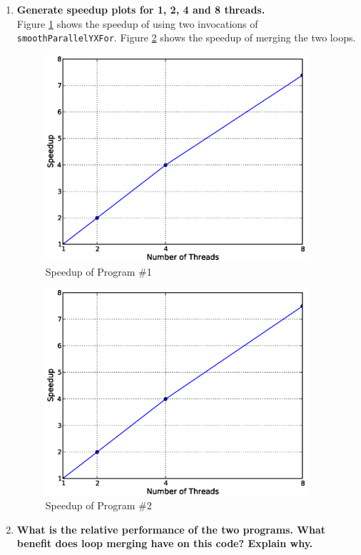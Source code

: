 \documentclass[letterpaper, 11pt]{article}
\begin{document}
\begin{enumerate}
\item \textbf{Generate speedup plots for 1, 2, 4 and 8 threads.}\\
Figure \ref{fig:prog1} shows the speedup of using two invocations of \texttt{smoothParallelYXFor}.  Figure \ref{fig:prog2} shows the speedup of merging the two loops. 
\begin{figure}[h]
    \centering
    \includegraphics[width=3.8in]{twoinv.eps}
    \caption{Speedup of Program \#1}
    \label{fig:prog1}
\end{figure}

\begin{figure}[h]
    \centering
    \includegraphics[width=3.8in]{merged.eps}
    \caption{Speedup of Program \#2}
    \label{fig:prog2}
\end{figure}
\item \textbf{What is the relative performance of the two programs. What benefit does loop merging have on this code? Explain why.}


\end{enumerate}
\end{document}
